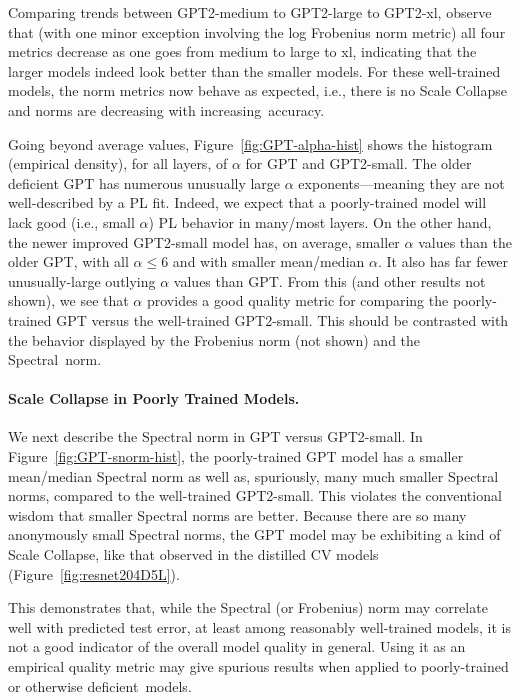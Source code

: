 Comparing trends between GPT2-medium to GPT2-large to GPT2-xl,
observe that (with one minor exception involving the log Frobenius norm metric) all four metrics decrease as one goes from medium to large to xl, indicating that the larger models indeed look better than the smaller models.
For these well-trained models, the norm metrics now behave as expected, i.e., there is no Scale Collapse and norms are decreasing with increasing~accuracy.

Going beyond average values, Figure~\ref{fig:GPT-alpha-hist} shows the histogram (empirical density), for all layers, of $\alpha$ for GPT and GPT2-small.  
The older deficient GPT has numerous unusually large $\alpha$ exponents---meaning they are not well-described by a PL fit.
Indeed, we expect that a poorly-trained model will lack good (i.e., small $\alpha$) PL behavior in many/most layers.
On the other hand, the newer improved GPT2-small model has, on average, smaller $\alpha$ values than the older GPT, with all $\alpha\le6$ and with smaller mean/median $\alpha$.
It also has far fewer unusually-large outlying $\alpha$ values than GPT.
From this (and other results not shown), we see that $\alpha$ provides a good quality metric for comparing the poorly-trained GPT versus the well-trained GPT2-small.
This should be contrasted with the behavior displayed by the Frobenius norm (not shown) and the Spectral~norm.


\paragraph{Scale Collapse in Poorly Trained Models.}

We next describe the Spectral norm in GPT versus GPT2-small.
In Figure~\ref{fig:GPT-snorm-hist}, the poorly-trained GPT model has a smaller mean/median Spectral norm as well as, spuriously, many much smaller Spectral norms, compared to the well-trained GPT2-small.
This violates the conventional wisdom that smaller Spectral norms are better.
Because there are so many anonymously small Spectral norms, the GPT model may be exhibiting a kind of Scale Collapse, like that observed in the distilled CV models (Figure~\ref{fig:resnet204D5L}).

This demonstrates that, while the Spectral (or Frobenius) norm may correlate well with predicted test error, at least among reasonably well-trained models, it is not a good indicator of the overall model quality in general.
Using it as an empirical quality metric may give spurious results when applied to poorly-trained or otherwise deficient~models. 

